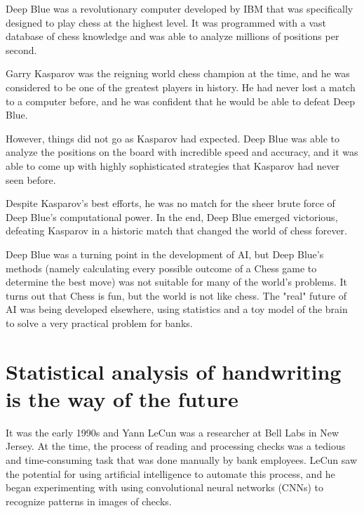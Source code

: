 Deep Blue was a revolutionary computer developed by IBM that was specifically designed to play chess at the highest level. It was programmed with a vast database of chess knowledge and was able to analyze millions of positions per second.

Garry Kasparov was the reigning world chess champion at the time, and he was considered to be one of the greatest players in history. He had never lost a match to a computer before, and he was confident that he would be able to defeat Deep Blue.

However, things did not go as Kasparov had expected. Deep Blue was able to analyze the positions on the board with incredible speed and accuracy, and it was able to come up with highly sophisticated strategies that Kasparov had never seen before.

Despite Kasparov's best efforts, he was no match for the sheer brute force of Deep Blue's computational power. In the end, Deep Blue emerged victorious, defeating Kasparov in a historic match that changed the world of chess forever.

Deep Blue was a turning point in the development of AI, but Deep Blue's methods (namely calculating every possible outcome of a Chess game to determine the best move) was not suitable for many of the world's problems. It turns out that Chess is fun, but the world is not like chess. The "real" future of AI was being developed elsewhere, using statistics and a toy model of the brain to solve a very practical problem for banks.

\section{Statistical analysis of handwriting is the way of the future}

It was the early 1990s and Yann LeCun was a researcher at Bell Labs in New Jersey. At the time, the process of reading and processing checks was a tedious and time-consuming task that was done manually by bank employees. LeCun saw the potential for using artificial intelligence to automate this process, and he began experimenting with using convolutional neural networks (CNNs) to recognize patterns in images of checks.

